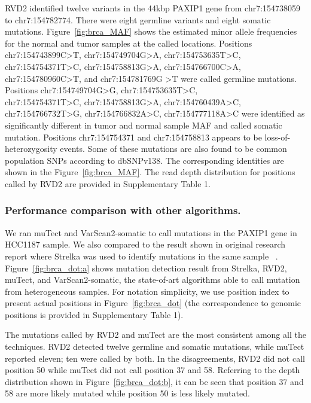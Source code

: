 \documentclass{bioinfo}
\begin{document}
RVD2 identified twelve variants in the 44kbp PAXIP1 gene from chr7:154738059 to chr7:154782774. There were eight germline variants and eight somatic mutations. %
Figure~\ref{fig:brca_MAF} shows the estimated minor allele frequencies for the normal and tumor samples at the called locations. Positions chr7:154743899C\textgreater T, chr7:154749704G\textgreater A, chr7:154753635T\textgreater C, chr7:154754371T\textgreater C, chr7:154758813G\textgreater A, chr7:154766700C\textgreater A, chr7:154780960C\textgreater T, and chr7:154781769G \textgreater T were called germline mutations. Positions chr7:154749704G\textgreater G, chr7:154753635T\textgreater C, \\ chr7:154754371T\textgreater C, chr7:154758813G\textgreater A, chr7:154760439A\textgreater C, chr7:154766732T\textgreater G,  chr7:154766832A\textgreater C, chr7:154777118A\textgreater C were identified as significantly different in tumor and normal sample MAF and called somatic mutation. Positions chr7:154754371 and chr7:154758813 appears to be loss-of-heterozygosity events. Some of these mutations are also found to be common population SNPs according to dbSNPv138. The corresponding identities are shown in the Figure~\ref{fig:brca_MAF}. The read depth distribution for positions called by RVD2 are provided in Supplementary Table 1. 

\subsubsection{Performance comparison with other algorithms.}

We ran muTect and VarScan2-somatic to call mutations in the PAXIP1 gene in HCC1187 sample. We also compared to the result shown in original research report where Strelka was used to identify mutations in the same sample ~\citep{hcc1187techreport}. Figure~\ref{fig:brca_dot:a} shows mutation detection result from Strelka, RVD2, muTect, and VarScan2-somatic, the state-of-art algorithms able to call mutation from heterogeneous samples. For notation simplicity, we use position index to present actual positions in Figure~\ref{fig:brca_dot} (the correspondence to genomic positions is provided in Supplementary Table 1). 

The mutations called by RVD2 and muTect are the most consistent among all the techniques. RVD2 detected twelve germline and somatic mutations, while muTect reported eleven; ten were called by both. In the disagreements, RVD2 did not call position 50 while muTect did not call position 37 and 58. Referring to the depth distribution shown in Figure~\ref{fig:brca_dot:b}, it can be seen that position 37 and 58 are more likely mutated while position 50 is less likely mutated. 
\end{document}
